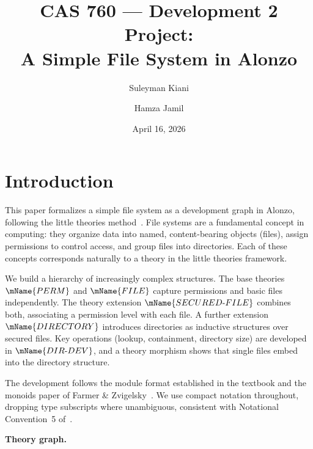 \documentclass[11pt]{article}
\title{CAS 760 --- Development 2 Project:\\
       A Simple File System in Alonzo}
\author{Suleyman Kiani \and Hamza Jamil}
\date{April 16, 2026}
\newcommand{\PERM}{\mName{PERM}}
\newcommand{\FILETYPE}{\mName{FILE}}
\newcommand{\SECFILE}{\mName{SECURED\text{-}FILE}}
\newcommand{\DIR}{\mName{DIRECTORY}}
\newcommand{\DIRDEV}{\mName{DIR\text{-}DEV}}
\begin{document}
\maketitle
\tableofcontents
\newpage

\section{Introduction}
\label{sec:intro}

This paper formalizes a simple file system as a development graph
in Alonzo, following the little theories method~\cite{farmer2025}.
File systems are a fundamental concept in computing: they organize
data into named, content-bearing objects (files), assign permissions
to control access, and group files into directories.  Each of these
concepts corresponds naturally to a theory in the little theories
framework.

We build a hierarchy of increasingly complex structures.  The base
theories $\PERM$ and $\FILETYPE$ capture permissions and basic files
independently.  The theory extension $\SECFILE$ combines both,
associating a permission level with each file.  A further extension
$\DIR$ introduces directories as inductive structures over secured
files.  Key operations (lookup, containment, directory size) are
developed in $\DIRDEV$, and a theory morphism shows that single files
embed into the directory structure.

The development follows the module format established in the textbook
and the monoids paper of Farmer \& Zvigelsky~\cite{monoids2025}.
We use compact notation throughout, dropping type subscripts where
unambiguous, consistent with Notational Convention~5
of~\cite{farmer2025}.

\medskip
\noindent\textbf{Theory graph.}

\begin{center}
\end{center}
\end{document}

